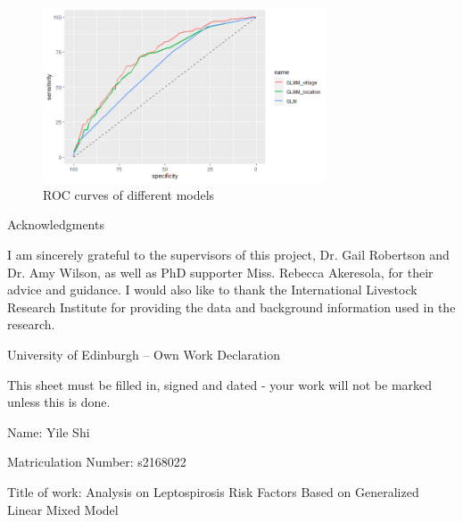 \documentclass[11pt,twoside]{article}
\numberwithin{Theorem}{section}
\numberwithin{Definition}{section}
\numberwithin{Lemma}{section}
\numberwithin{Algorithm}{section}
\numberwithin{equation}{section}
\begin{document}
\begin{figure}[!h]
	\centering
	\includegraphics[width = 0.75\textwidth]{Images/ROC.png}
	\caption{ROC curves of different models}
	\label{fig:ROC}
\end{figure}

\clearpage

\begin{center}
\Large{Acknowledgments}
\end{center}

I am sincerely grateful to the supervisors of this project, Dr. Gail Robertson and Dr. Amy Wilson, as well as PhD supporter Miss. Rebecca Akeresola, for their advice and guidance. I would also like to thank the International Livestock Research Institute for providing the data and background information used in the research. 

\clearpage


\begin{center}
\Large{University of Edinburgh – Own Work Declaration}
\end{center}

This sheet must be filled in, signed and dated - your work will not be marked unless this is done.
\vspace{1cm}

Name: Yile Shi

Matriculation Number: s2168022

Title of work: Analysis on Leptospirosis Risk Factors Based on Generalized Linear Mixed Model

\vspace{1cm}
\end{document}
